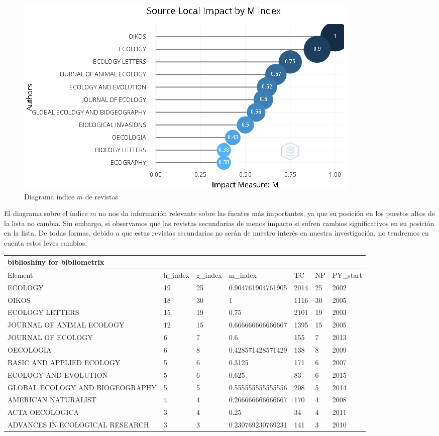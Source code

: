 \documentclass[
]{article}
\begin{document}
\begin{figure}
\centering
\includegraphics{SocurceImpactByMIndex.png}
\caption{Diagrama índice \(m\) de revistas}
\end{figure}

El diagrama sobre el índice \(m\) no nos da información relevante sobre
las fuentes más importantes, ya que su posición en los puestos altos de
la lista no cambia. Sin embargo, si observamos que las revistas
secundarias de menos impacto si sufren cambios significativos en su
posición en la lista. De todas formas, debido a que estas revistas
secundarias no serán de nuestro interés en nuestra investigación, no
tendremos en cuenta estos leves cambios.

\begin{longtable}[]{@{}lllllll@{}}
\toprule
biblioshiny for bibliometrix & & & & & & \\
\midrule
\endhead
Element & h\_index & g\_index & m\_index & TC & NP & PY\_start \\
ECOLOGY & 19 & 25 & 0.904761904761905 & 2014 & 25 & 2002 \\
OIKOS & 18 & 30 & 1 & 1116 & 30 & 2005 \\
ECOLOGY LETTERS & 15 & 19 & 0.75 & 2101 & 19 & 2003 \\
JOURNAL OF ANIMAL ECOLOGY & 12 & 15 & 0.666666666666667 & 1395 & 15 &
2005 \\
JOURNAL OF ECOLOGY & 6 & 7 & 0.6 & 155 & 7 & 2013 \\
OECOLOGIA & 6 & 8 & 0.428571428571429 & 138 & 8 & 2009 \\
BASIC AND APPLIED ECOLOGY & 5 & 6 & 0.3125 & 171 & 6 & 2007 \\
ECOLOGY AND EVOLUTION & 5 & 6 & 0.625 & 83 & 6 & 2015 \\
GLOBAL ECOLOGY AND BIOGEOGRAPHY & 5 & 5 & 0.555555555555556 & 208 & 5 &
2014 \\
AMERICAN NATURALIST & 4 & 4 & 0.266666666666667 & 170 & 4 & 2008 \\
ACTA OECOLOGICA & 3 & 4 & 0.25 & 34 & 4 & 2011 \\
ADVANCES IN ECOLOGICAL RESEARCH & 3 & 3 & 0.230769230769231 & 141 & 3 &
2010 \\
\bottomrule
\end{longtable}
\end{document}
